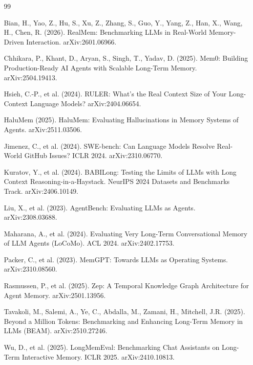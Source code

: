 \documentclass[11pt]{article}
\begin{document}
\begin{thebibliography}{99}

Bian, H., Yao, Z., Hu, S., Xu, Z., Zhang, S., Guo, Y., Yang, Z., Han, X.,
Wang, H., Chen, R. (2026). RealMem: Benchmarking LLMs in Real-World
Memory-Driven Interaction. arXiv:2601.06966.

Chhikara, P., Khant, D., Aryan, S., Singh, T., Yadav, D. (2025). Mem0:
Building Production-Ready AI Agents with Scalable Long-Term Memory.
arXiv:2504.19413.

Hsieh, C.-P., et al. (2024). RULER: What's the Real Context Size of Your
Long-Context Language Models? arXiv:2404.06654.

HaluMem (2025). HaluMem: Evaluating Hallucinations in Memory Systems of
Agents. arXiv:2511.03506.

Jimenez, C., et al. (2024). SWE-bench: Can Language Models Resolve
Real-World GitHub Issues? ICLR 2024. arXiv:2310.06770.

Kuratov, Y., et al. (2024). BABILong: Testing the Limits of LLMs with Long
Context Reasoning-in-a-Haystack. NeurIPS 2024 Datasets and Benchmarks Track.
arXiv:2406.10149.

Liu, X., et al. (2023). AgentBench: Evaluating LLMs as Agents.
arXiv:2308.03688.

Maharana, A., et al. (2024). Evaluating Very Long-Term Conversational Memory
of LLM Agents (LoCoMo). ACL 2024. arXiv:2402.17753.

Packer, C., et al. (2023). MemGPT: Towards LLMs as Operating Systems.
arXiv:2310.08560.

Rasmussen, P., et al. (2025). Zep: A Temporal Knowledge Graph Architecture
for Agent Memory. arXiv:2501.13956.

Tavakoli, M., Salemi, A., Ye, C., Abdalla, M., Zamani, H., Mitchell, J.R.
(2025). Beyond a Million Tokens: Benchmarking and Enhancing Long-Term Memory
in LLMs (BEAM). arXiv:2510.27246.

Wu, D., et al. (2025). LongMemEval: Benchmarking Chat Assistants on
Long-Term Interactive Memory. ICLR 2025. arXiv:2410.10813.


\end{thebibliography}
\end{document}
